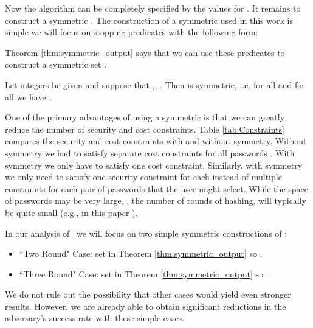 
Now the  algorithm can be completely specified by the values  for . It remains to construct a symmetric . The construction of a symmetric  used in this work is simple we will focus on stopping predicates with the following form: 



Theorem \ref{thm:symmetric_output} says that we can use these predicates to construct a symmetric set . 

\begin{theorem}
\label{thm:symmetric_output}
Let integers  be given and suppose that    ,, . Then   is symmetric, i.e. for all  and for all  we have . 
\end{theorem}

One of the primary advantages of using a symmetric  is that we can greatly reduce the number of security and cost constraints. Table \ref{tab:Constraints} compares the security and cost constraints with and without symmetry. Without symmetry we had to satisfy separate cost constraints for all passwords . With symmetry we only have to satisfy one cost constraint.  Similarly, with symmetry we only need to satisfy one security constraint for each  instead of multiple constraints for each pair of passwords  that the user might select. While the space of passwords may be very large, , the number of rounds of hashing, will typically be quite small (e.g., in this paper ).   

In our analysis of \clientcash~we will focus on two simple symmetric constructions of :
\begin{itemize}
\item ``Two Round" Case: set  in Theorem \ref{thm:symmetric_output} so .
\item ``Three Round" Case: set  in Theorem \ref{thm:symmetric_output} so . 
\end{itemize}
We do not rule out the possibility that other cases would yield even stronger results. However, we are already able to obtain significant reductions in the adversary's success rate with these simple cases.

